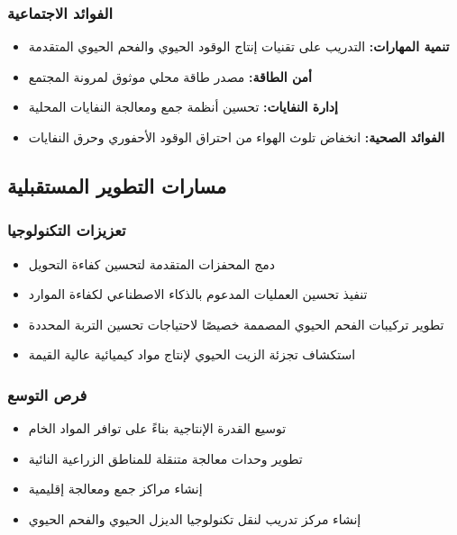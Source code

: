 \subsubsection{الفوائد الاجتماعية}
\begin{itemize}
    \item \textbf{تنمية المهارات:} التدريب على تقنيات إنتاج الوقود الحيوي والفحم الحيوي المتقدمة
    \item \textbf{أمن الطاقة:} مصدر طاقة محلي موثوق لمرونة المجتمع
    \item \textbf{إدارة النفايات:} تحسين أنظمة جمع ومعالجة النفايات المحلية
    \item \textbf{الفوائد الصحية:} انخفاض تلوث الهواء من احتراق الوقود الأحفوري وحرق النفايات
\end{itemize}

\subsection{مسارات التطوير المستقبلية}

\subsubsection{تعزيزات التكنولوجيا}
\begin{itemize}
    \item دمج المحفزات المتقدمة لتحسين كفاءة التحويل
    \item تنفيذ تحسين العمليات المدعوم بالذكاء الاصطناعي لكفاءة الموارد
    \item تطوير تركيبات الفحم الحيوي المصممة خصيصًا لاحتياجات تحسين التربة المحددة
    \item استكشاف تجزئة الزيت الحيوي لإنتاج مواد كيميائية عالية القيمة
\end{itemize}

\subsubsection{فرص التوسع}
\begin{itemize}
    \item توسيع القدرة الإنتاجية بناءً على توافر المواد الخام
    \item تطوير وحدات معالجة متنقلة للمناطق الزراعية النائية
    \item إنشاء مراكز جمع ومعالجة إقليمية
    \item إنشاء مركز تدريب لنقل تكنولوجيا الديزل الحيوي والفحم الحيوي
\end{itemize}

